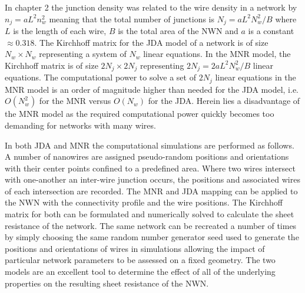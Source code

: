 In chapter 2 the junction density was related to the wire density in a network by $n_j = a L^2 n_w^2 $ meaning that the total number of junctions is $N_j = a L^2 N_w^2 / B$ where $L$ is the length of each wire, $B$ is the total area of the NWN and $a$ is a constant $\approx 0.318$. The Kirchhoff matrix for the JDA model of a network is of size $N_w \times N_w$ representing a system of $N_w$ linear equations. In the MNR model, the Kirchhoff matrix is of size $2 N_j\times 2 N_j$ representing $2N_j = 2 a L^2 N_w^2/B$ linear equations. The computational power to solve a set of $2 N_j$ linear equations in the MNR model is an order of magnitude higher than needed for the JDA model, i.e. $O(N_w^2)$ for the MNR versus $O(N_w)$ for the JDA. Herein lies a disadvantage of the MNR model as the required computational power quickly becomes too demanding for networks with many wires.

In both JDA and MNR the computational simulations are performed as follows. A number of nanowires are assigned pseudo-random positions and orientations with their center points confined to a predefined area. Where two wires intersect with one-another an inter-wire junction occurs, the positions and associated wires of each intersection are recorded. The MNR and JDA mapping can be applied to the NWN with the connectivity profile and the wire positions. The Kirchhoff matrix for both can be formulated and numerically solved to calculate the sheet resistance of the network. The same network can be recreated a number of times by simply choosing the same random number generator seed used to generate the positions and orientations of wires in simulations allowing the impact of particular network parameters to be assessed on a fixed geometry. The two models are an excellent tool to determine the effect of all of the underlying properties on the resulting sheet resistance of the NWN. 

